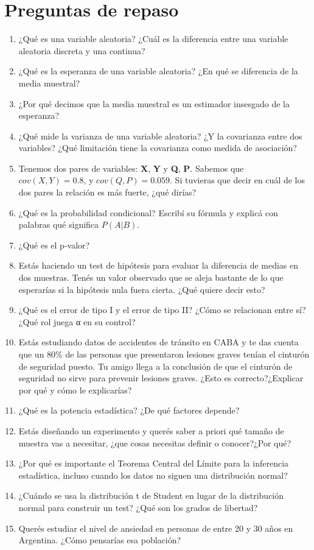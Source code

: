 \documentclass[
  letterpaper,
  DIV=11,
  numbers=noendperiod,
  oneside]{scrreprt}
\begin{document}
\hypertarget{preguntas-de-repaso-1}{%
\section{Preguntas de repaso}\label{preguntas-de-repaso-1}}

\begin{enumerate}
\def\labelenumi{\arabic{enumi}.}
\item
  ¿Qué es una variable aleatoria? ¿Cuál es la diferencia entre una
  variable aleatoria discreta y una continua?
\item
  ¿Qué es la esperanza de una variable aleatoria? ¿En qué se diferencia
  de la media muestral?
\item
  ¿Por qué decimos que la media muestral es un estimador insesgado de la
  esperanza?
\item
  ¿Qué mide la varianza de una variable aleatoria? ¿Y la covarianza
  entre dos variables? ¿Qué limitación tiene la covarianza como medida
  de asociación?
\item
  Tenemos dos pares de variables: \textbf{X}, \textbf{Y} y \textbf{Q},
  \textbf{P}. Sabemos que \(cov(X,Y)= 0.8\), y \(cov(Q,P)= 0.059\). Si
  tuvieras que decir en cuál de los dos pares la relación es más fuerte,
  ¿qué dirías?
\item
  ¿Qué es la probabilidad condicional? Escribí su fórmula y explicá con
  palabras qué significa \(P(A|B)\).
\item
  ¿Qué es el p-valor?
\item
  Estás haciendo un test de hipótesis para evaluar la diferencia de
  medias en dos muestras. Tenés un valor observado que se aleja bastante
  de lo que esperarías si la hipótesis nula fuera cierta. ¿Qué quiere
  decir esto?
\item
  ¿Qué es el error de tipo I y el error de tipo II? ¿Cómo se relacionan
  entre sí? ¿Qué rol juega α en su control?
\item
  Estás estudiando datos de accidentes de tránsito en CABA y te das
  cuenta que un 80\% de las personas que presentaron lesiones graves
  tenían el cinturón de seguridad puesto. Tu amigo llega a la conclusión
  de que el cinturón de seguridad no sirve para prevenir lesiones
  graves. ¿Esto es correcto?¿Explicar por qué y cómo le explicarías?
\item
  ¿Qué es la potencia estadística? ¿De qué factores depende?
\item
  Estás diseñando un experimento y querés saber a priori qué tamaño de
  muestra vas a necesitar, ¿que cosas necesitas definir o conocer?¿Por
  qué?
\item
  ¿Por qué es importante el Teorema Central del Límite para la
  inferencia estadística, incluso cuando los datos no siguen una
  distribución normal?
\item
  ¿Cuándo se usa la distribución t de Student en lugar de la
  distribución normal para construir un test? ¿Qué son los grados de
  libertad?
\item
  Querés estudiar el nivel de ansiedad en personas de entre 20 y 30 años
  en Argentina. ¿Cómo pensarías esa población?
\end{enumerate}
\end{document}
